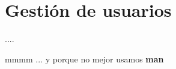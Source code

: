 \section{Gestión de usuarios}

\begin{frame}[c]{....}
  \begin{center}
    mmmm ... y porque no mejor usamos \textbf{man}
  \end{center}
\end{frame}

%
%

